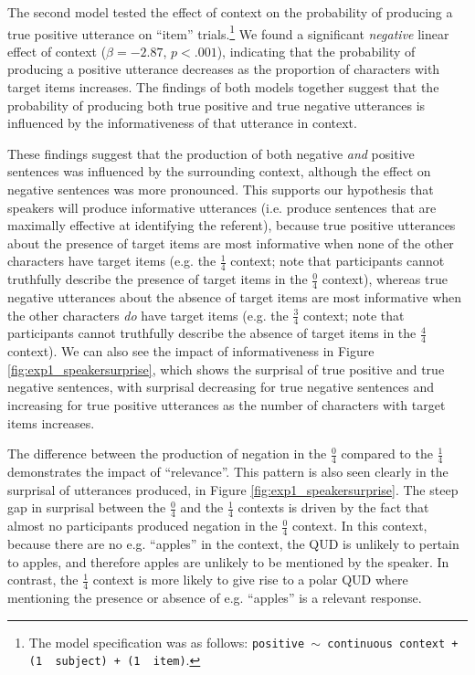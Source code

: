 \documentclass[man, floatsintext, noapacite]{apa6}
\begin{document}
The second model tested the effect of context on the probability of producing a true positive utterance on ``item'' trials.\footnote{The model specification was as follows: \texttt{positive $\sim$  continuous context + (1~\textbar~subject) +  (1~\textbar~item)}.} We found a significant \textit{negative} linear effect of context ($\beta= -2.87$, $p< .001$), indicating that the probability of producing a positive utterance decreases as the proportion of characters with target items increases. The findings of both models together suggest that the probability of producing both true positive and true negative utterances is influenced by the informativeness of that utterance in context.

These findings suggest that the production of both negative \textit{and} positive sentences was influenced by the surrounding context, although the effect on negative sentences was more pronounced. This supports our hypothesis that speakers will produce informative utterances (i.e. produce sentences that are maximally effective at identifying the referent), because true positive utterances about the presence of target items are most informative when none of the other characters have target items (e.g. the $\frac{1}{4}$ context; note that participants cannot truthfully describe the presence of target items in the $\frac{0}{4}$ context), whereas true negative utterances about the absence of target items are most informative when the other characters \textit{do} have target items (e.g. the $\frac{3}{4}$ context; note that participants cannot truthfully describe the absence of target items in the $\frac{4}{4}$ context). We can also see the impact of informativeness in Figure \ref{fig:exp1_speakersurprise}, which shows the surprisal of true positive and true negative sentences, with surprisal decreasing for true negative sentences and increasing for true positive utterances as the number of characters with target items increases. 

The difference between the production of negation in the $\frac{0}{4}$ compared to the  $\frac{1}{4}$ demonstrates the impact of ``relevance''. This pattern is also seen clearly in the surprisal of utterances produced, in Figure \ref{fig:exp1_speakersurprise}. The steep gap in surprisal between the  $\frac{0}{4}$ and the  $\frac{1}{4}$ contexts is driven by the fact that almost no participants produced negation in the  $\frac{0}{4}$ context. In this context, because there are no e.g. ``apples'' in the context, the QUD is unlikely to pertain to apples, and therefore apples are unlikely to be mentioned by the speaker. In contrast, the $\frac{1}{4}$ context is more likely to give rise to a polar QUD where mentioning the presence or absence of e.g. ``apples'' is a relevant response. 
\end{document}
